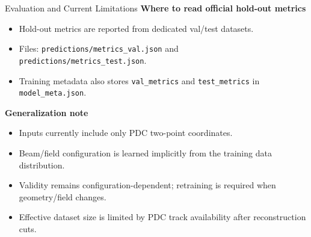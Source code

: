 \documentclass[aspectratio=169]{beamer}
\begin{document}
\begin{frame}{Evaluation and Current Limitations}
\textbf{Where to read official hold-out metrics}
\begin{itemize}
\item Hold-out metrics are reported from dedicated val/test datasets.
\item Files: \texttt{predictions/metrics\_val.json} and \texttt{predictions/metrics\_test.json}.
\item Training metadata also stores \texttt{val\_metrics} and \texttt{test\_metrics} in \texttt{model\_meta.json}.
\end{itemize}

\textbf{Generalization note}
\begin{itemize}
\item Inputs currently include only PDC two-point coordinates.
\item Beam/field configuration is learned implicitly from the training data distribution.
\item Validity remains configuration-dependent; retraining is required when geometry/field changes.
\item Effective dataset size is limited by PDC track availability after reconstruction cuts.
\end{itemize}
\end{frame}
\end{document}
